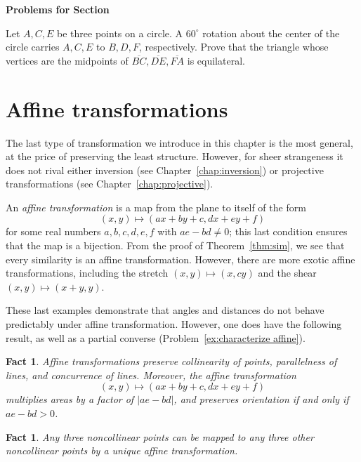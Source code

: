 \documentclass[12pt]{book}
\newcounter{exc}
\numberwithin{exc}{section}
\numberwithin{figure}{section}
\newenvironment{exer}{\vspace{0.1in}
\noindent \textbf{Problems for Section~\thesection} \vspace{0.1in}
\begin{list}{\arabic{exc}.}{\usecounter{exc}}}{\end{list}}
\newtheorem{fact}[theorem]{Fact}
\numberwithin{equation}{theorem}
\def\ii{\item}
\def\seg#1{\overline{#1}}
\begin{document}
\begin{exer}
\ii
Let $A,C,E$ be three points on a circle. A $60^{\circ}$ rotation about 
the center of the circle
carries $A,C,E$ to $B,D,F$, respectively. Prove that the triangle 
whose vertices are 
the midpoints of $\seg{BC}, \seg{DE}, \seg{FA}$ is equilateral.

\end{exer}

\section{Affine transformations}

The last type of transformation we introduce in this chapter
is the most general, at 
the price of preserving the least structure. However, for sheer 
strangeness it does not rival either inversion (see Chapter~\ref{chap:inversion}) or projective 
transformations (see Chapter~\ref{chap:projective}).

An \emph{affine transformation}   is a map from the plane to itself of the form
\[
(x, y) \mapsto (ax + by + c, dx + ey + f)
\]
for some real numbers $a,b,c,d,e,f$ with $ae-bd \neq 0$; this last condition ensures that the map is a bijection.
From the proof of Theorem~\ref{thm:sim}, we see that every similarity is an affine transformation.
However, there are more exotic 
affine transformations, including the stretch $(x,y) \mapsto 
(x,cy)$ and the shear $(x,y) \mapsto (x+y,y)$.

These last examples demonstrate that angles and distances do not behave predictably under affine transformation. However, one does have the following result, as well as a partial converse (Problem~\ref{ex:characterize affine}).
\begin{fact}
Affine transformations preserve collinearity of points, parallelness of lines, and concurrence of lines. Moreover, the affine transformation
\[
(x, y) \mapsto (ax + by + c, dx + ey + f)
\]
multiplies areas by a factor of $|ae-bd|$, and preserves orientation if and only if $ae-bd > 0$.
\end{fact}

\begin{fact} \label{ex:aff}
Any three noncollinear points can be mapped to any three other 
noncollinear points by a unique affine transformation.
\end{fact}
\end{document}
